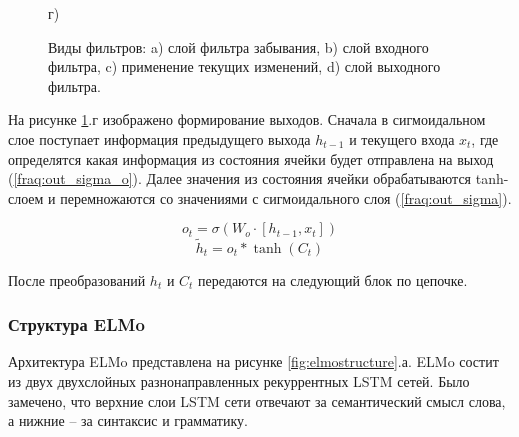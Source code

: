 \documentclass[a4paper,14pt]{article}
\begin{document}
\begin{figure}[H]
\begin{minipage}[h]{0.4\linewidth}
	\end{minipage}
	\hfill
	\begin{minipage}[h]{0.4\linewidth}
		 г) \\
	\end{minipage}
	\caption{Виды фильтров: 
		 a) слой фильтра забывания,
		 b) слой входного фильтра,
		 c) применение текущих изменений,
		 d) слой выходного фильтра.}
	\label{fig:LSTM_layers}
\end{figure}

На рисунке \ref{fig:LSTM_layers}.г изображено формирование выходов.
Сначала в сигмоидальном слое поступает информация предыдущего выхода $h_{t−1}$ и текущего входа $x_t$, где определятся какая информация из состояния ячейки будет отправлена на выход (\ref{fraq:out_sigma_o}).
Далее значения из состояния ячейки обрабатываются tanh-слоем и перемножаются со значениями с сигмоидального слоя (\ref*{fraq:out_sigma}).

\begin{equation}
	o_t = \sigma(W_o\cdot[h_{t-1},x_t]) 
	\label{fraq:out_sigma_o}
\end{equation}
\begin{equation}
	\tilde h_t = o_t * \tanh(C_t)
	\label{fraq:out_sigma}
\end{equation}

После преобразований $h_t$ и $C_t$ передаются на следующий блок по цепочке.	

\subsubsection{Структура ELMo}

Архитектура ELMo представлена на рисунке \ref{fig:elmostructure}.а.
ELMo состит из двух двухслойных разнонаправленных рекуррентных LSTM сетей.
Было замечено, что верхние слои LSTM сети отвечают за семантический смысл слова, а нижние -- за синтаксис и грамматику.
\end{document}
